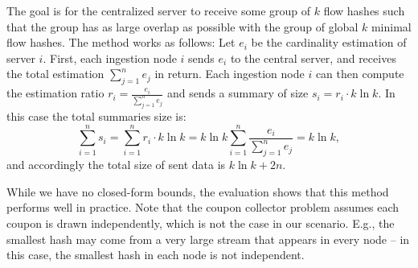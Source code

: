The goal is for the centralized server to receive some group of $k$ flow hashes such that the group has as large overlap as possible with the group of global $k$ minimal flow hashes. The method works as follows: Let $e_i$ be the cardinality estimation of server $i$. First, each ingestion node $i$ sends $e_i$ to the central server, and receives the total estimation $\sum\limits_{j=1}^n e_j$ in return. Each ingestion node $i$ can then compute the estimation ratio
$r_i = \frac{e_i}{\sum\limits_{j=1}^n e_j}$ and sends a summary of size  $s_i = r_i \cdot k \ln{k}$. In this case the total summaries size is: 
\[\sum\limits_{i=1}^n s_i = \sum\limits_{i=1}^n  r_i \cdot k \ln{k}= k\ln{k}\sum\limits_{i=1}^n \frac{e_i}{\sum\limits_{j=1}^n e_j} = k\ln{k}, \]
and accordingly the total size of sent data is $k\ln{k} + 2n$.


 While we have no closed-form bounds, the evaluation shows that this method performs well in practice. Note that the coupon collector problem assumes each coupon is drawn independently, which is not the case in our scenario. E.g., the smallest hash may come from a very large stream that appears in every node -- in this case, the smallest hash in each node is not independent.

